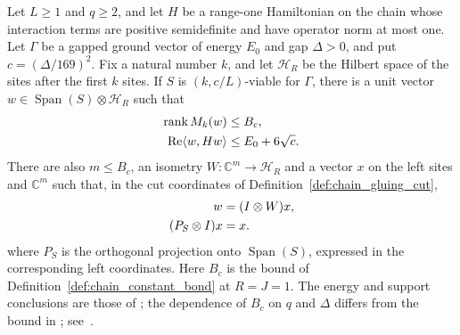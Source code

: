 \begin{lemma}
    \label{thm:lvv_viable_trimmed_witness_library_bond}
    \leanok
    Let $L\ge1$ and $q\ge2$, and let $H$ be a range-one Hamiltonian on the
    chain whose interaction terms are positive semidefinite and have
    operator norm at most one. Let $\Gamma$ be a gapped ground vector of
    energy $E_0$ and gap $\Delta>0$, and put $c=(\Delta/169)^2$.
    Fix a natural number $k$, and let $\mathcal H_R$ be the Hilbert space
    of the sites after the first $k$ sites.
    If $S$ is $(k,c/L)$-viable for $\Gamma$, there is a unit vector
    $w\in\operatorname{Span}(S)\otimes\mathcal H_R$ such that
    \begin{align}
        \operatorname{rank}M_k(w)            & \le B_c,\notag           \\
        \operatorname{Re}\langle w,Hw\rangle & \le E_0+6\sqrt c. \notag
    \end{align}
    There are also $m\le B_c$, an isometry $W:\mathbb C^m\to\mathcal H_R$
    and a vector $x$ on the left sites and $\mathbb C^m$ such that, in the
    cut coordinates of Definition~\ref{def:chain_gluing_cut},
    \begin{align}
        w               & =(I\otimes W)x,\notag \\
        (P_S\otimes I)x & =x.\notag
    \end{align}
    where $P_S$ is the orthogonal projection onto $\operatorname{Span}(S)$,
    expressed in the corresponding left coordinates.
    Here $B_c$ is the bound of Definition~\ref{def:chain_constant_bond} at
    $R=J=1$. The energy and support conclusions are those of
    \cite[Lemma~2.6, source lines 509--515]{Landau2015Polynomial}; the
    dependence of $B_c$ on $q$ and $\Delta$ differs from the bound in
    \cite[Lemma~1.7, source lines 342--345]{Landau2015Polynomial};
    see~\cite{gap:lvv13_constant_bond}.
\end{lemma}

